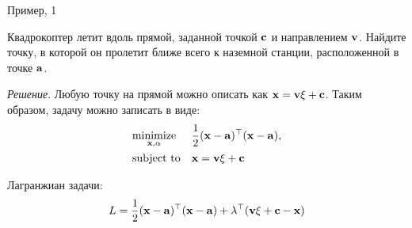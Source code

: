 \documentclass{beamer}
\begin{document}
\begin{frame}{Пример, 1}
	\begin{flushleft}
		
		Квадрокоптер летит вдоль прямой, заданной точкой $\mathbf{c}$ и направлением $\mathbf{v}$. Найдите точку, в которой он пролетит ближе всего к наземной станции, расположенной в точке $\mathbf{a}$.
		
		\bigskip
		
		\emph{Решение}. Любую точку на прямой можно описать как $\mathbf{x} = \mathbf{v} \xi + \mathbf{c}$. Таким образом, задачу можно записать в виде:
		\begin{equation}
			\begin{aligned}
				& \underset{\mathbf{x}, \alpha}{\text{minimize}}
				& & \frac{1}{2}(\mathbf{x}- \mathbf{a})^\top(\mathbf{x}- \mathbf{a}), \\
				& \text{subject to}
				& & \mathbf{x} = \mathbf{v} \xi + \mathbf{c}
			\end{aligned}
		\end{equation}
		
		Лагранжиан задачи:
		\begin{equation}
			L =  \frac{1}{2}(\mathbf{x}- \mathbf{a})^\top(\mathbf{x}- \mathbf{a}) + \lambda^\top  ( \mathbf{v} \xi + \mathbf{c} - \mathbf{x})
		\end{equation}
		
		
		
	\end{flushleft}
\end{frame}
\end{document}
